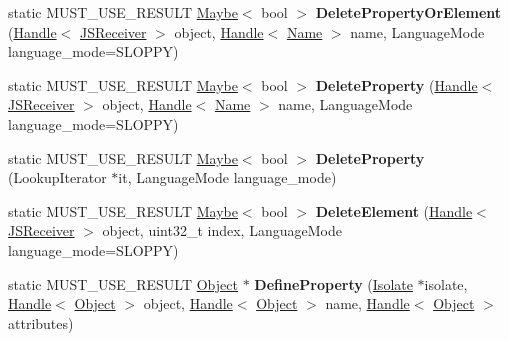 \begin{DoxyCompactItemize}
\item 
static M\+U\+S\+T\+\_\+\+U\+S\+E\+\_\+\+R\+E\+S\+U\+LT \hyperlink{classv8_1_1_maybe}{Maybe}$<$ bool $>$ {\bfseries Delete\+Property\+Or\+Element} (\hyperlink{classv8_1_1internal_1_1_handle}{Handle}$<$ \hyperlink{classv8_1_1internal_1_1_j_s_receiver}{J\+S\+Receiver} $>$ object, \hyperlink{classv8_1_1internal_1_1_handle}{Handle}$<$ \hyperlink{classv8_1_1internal_1_1_name}{Name} $>$ name, Language\+Mode language\+\_\+mode=S\+L\+O\+P\+PY)\hypertarget{classv8_1_1internal_1_1_j_s_receiver_afc4fa35fb6017ca4386249c215ad7b79}{}\label{classv8_1_1internal_1_1_j_s_receiver_afc4fa35fb6017ca4386249c215ad7b79}

\item 
static M\+U\+S\+T\+\_\+\+U\+S\+E\+\_\+\+R\+E\+S\+U\+LT \hyperlink{classv8_1_1_maybe}{Maybe}$<$ bool $>$ {\bfseries Delete\+Property} (\hyperlink{classv8_1_1internal_1_1_handle}{Handle}$<$ \hyperlink{classv8_1_1internal_1_1_j_s_receiver}{J\+S\+Receiver} $>$ object, \hyperlink{classv8_1_1internal_1_1_handle}{Handle}$<$ \hyperlink{classv8_1_1internal_1_1_name}{Name} $>$ name, Language\+Mode language\+\_\+mode=S\+L\+O\+P\+PY)\hypertarget{classv8_1_1internal_1_1_j_s_receiver_a3c5811d2c51b3b66f18e95547bea0edf}{}\label{classv8_1_1internal_1_1_j_s_receiver_a3c5811d2c51b3b66f18e95547bea0edf}

\item 
static M\+U\+S\+T\+\_\+\+U\+S\+E\+\_\+\+R\+E\+S\+U\+LT \hyperlink{classv8_1_1_maybe}{Maybe}$<$ bool $>$ {\bfseries Delete\+Property} (Lookup\+Iterator $\ast$it, Language\+Mode language\+\_\+mode)\hypertarget{classv8_1_1internal_1_1_j_s_receiver_a7dcab7b94abc19c9708d5db0ab0029c0}{}\label{classv8_1_1internal_1_1_j_s_receiver_a7dcab7b94abc19c9708d5db0ab0029c0}

\item 
static M\+U\+S\+T\+\_\+\+U\+S\+E\+\_\+\+R\+E\+S\+U\+LT \hyperlink{classv8_1_1_maybe}{Maybe}$<$ bool $>$ {\bfseries Delete\+Element} (\hyperlink{classv8_1_1internal_1_1_handle}{Handle}$<$ \hyperlink{classv8_1_1internal_1_1_j_s_receiver}{J\+S\+Receiver} $>$ object, uint32\+\_\+t index, Language\+Mode language\+\_\+mode=S\+L\+O\+P\+PY)\hypertarget{classv8_1_1internal_1_1_j_s_receiver_a6d71c4fa9426bd7c7a9bc87bb818f54d}{}\label{classv8_1_1internal_1_1_j_s_receiver_a6d71c4fa9426bd7c7a9bc87bb818f54d}

\item 
static M\+U\+S\+T\+\_\+\+U\+S\+E\+\_\+\+R\+E\+S\+U\+LT \hyperlink{classv8_1_1internal_1_1_object}{Object} $\ast$ {\bfseries Define\+Property} (\hyperlink{classv8_1_1internal_1_1_isolate}{Isolate} $\ast$isolate, \hyperlink{classv8_1_1internal_1_1_handle}{Handle}$<$ \hyperlink{classv8_1_1internal_1_1_object}{Object} $>$ object, \hyperlink{classv8_1_1internal_1_1_handle}{Handle}$<$ \hyperlink{classv8_1_1internal_1_1_object}{Object} $>$ name, \hyperlink{classv8_1_1internal_1_1_handle}{Handle}$<$ \hyperlink{classv8_1_1internal_1_1_object}{Object} $>$ attributes)\hypertarget{classv8_1_1internal_1_1_j_s_receiver_a51331e1c7cf54260ad64cb1c5e436160}{}\label{classv8_1_1internal_1_1_j_s_receiver_a51331e1c7cf54260ad64cb1c5e436160}


\end{DoxyCompactItemize}
